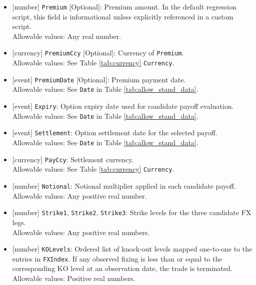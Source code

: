 \begin{itemize}
	\item{}[number] \lstinline!Premium! [Optional]: Premium amount. In the default regression script,
		this field is informational unless explicitly referenced in a custom script. \\
		Allowable values: Any real number.

	\item{}[currency] \lstinline!PremiumCcy! [Optional]: Currency of \lstinline!Premium!. \\
		Allowable values: See Table \ref{tab:currency} \lstinline!Currency!.

	\item{}[event] \lstinline!PremiumDate! [Optional]: Premium payment date. \\
		Allowable values: See \lstinline!Date! in Table \ref{tab:allow_stand_data}.

	\item{}[event] \lstinline!Expiry!: Option expiry date used for candidate payoff evaluation. \\
		Allowable values: See \lstinline!Date! in Table \ref{tab:allow_stand_data}.

	\item{}[event] \lstinline!Settlement!: Option settlement date for the selected payoff. \\
		Allowable values: See \lstinline!Date! in Table \ref{tab:allow_stand_data}.

	\item{}[currency] \lstinline!PayCcy!: Settlement currency. \\
		Allowable values: See Table \ref{tab:currency} \lstinline!Currency!.

	\item{}[number] \lstinline!Notional!: Notional multiplier applied in each candidate payoff. \\
		Allowable values: Any positive real number.

	\item{}[number] \lstinline!Strike1!, \lstinline!Strike2!, \lstinline!Strike3!: Strike levels for
		the three candidate FX legs. \\
		Allowable values: Any positive real numbers.

	\item{}[number] \lstinline!KOLevels!: Ordered list of knock-out levels mapped one-to-one to the
		entries in \lstinline!FXIndex!. If any observed fixing is less than or equal to the corresponding
		KO level at an observation date, the trade is terminated. \\
		Allowable values: Positive real numbers.


\end{itemize}
